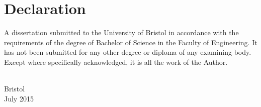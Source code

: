 \section*{Declaration}
A dissertation submitted to the University of Bristol in 
accordance with the requirements of the degree of Bachelor of Science in 
the Faculty of Engineering. It has not been submitted for any other 
degree or diploma of any examining body. Except where 
specifically acknowledged, it is all the work of the Author. 

\begin{flushright}
  \textsc{\theauthor}\\
  Bristol\\
  July 2015
\end{flushright}

